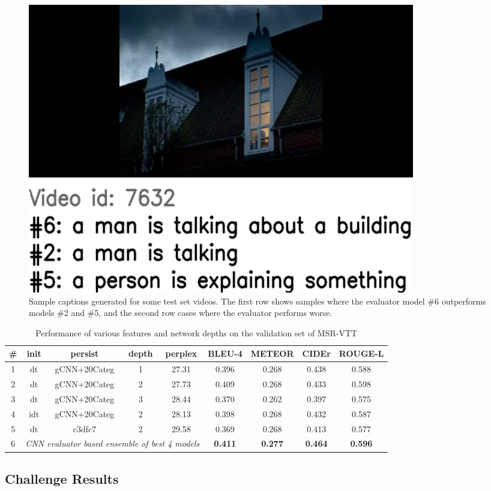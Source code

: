 \begin{figure}[thp]
\begin{center}
    \includegraphics[width=0.30\linewidth]{images/7632.jpg}
  \end{center}
  \vspace*{-5mm}
  \caption{Sample captions generated for some test set videos. The
    first row shows samples where the evaluator model \#6 outperforms
    models \#2 and \#5, and the second row cases where the evaluator
    performs worse.}
  \label{fig:capSamps}
\end{figure}

\begin{table}[thp]
  \caption{Performance of various features and 
    network depths on the validation set of MSR-VTT}
  \newcommand{\modpar}[4]{%
    \multirow{2}{*}{\emph{#1}} & \multirow{2}{*}{#2} & \multirow{2}{*}{#3}
    & \multirow{2}{*}{#4}}
  \centering
  \newcommand{\bs}{\small\bf}
  \begin{tabular}{||c|c|c|c|c|c|c|c|c|}
    \hline\hline
    \bf\# &\bf init &\bf persist &\bf depth &\bf perplex &\bs BLEU-4 &\bs METEOR &\bs CIDEr &\bs ROUGE-L \\\hline\hline
    1 & dt  & gCNN+20Categ & 1  & 27.31 & 0.396 & 0.268 & 0.438 & 0.588 \\
    2 & dt  & gCNN+20Categ & 2  & 27.73 & 0.409 & 0.268 & 0.433 & 0.598 \\
    3 & dt  & gCNN+20Categ & 3  & 28.44 & 0.370 & 0.262 & 0.397 & 0.575 \\\hline
    4 & idt & gCNN+20Categ & 2  & 28.13 & 0.398 & 0.268 & 0.432 & 0.587 \\
    5 & dt  & c3dfc7       & 2  & 29.58 & 0.369 & 0.268 & 0.413 & 0.577 \\\hline
    6 & \multicolumn{4}{c|}{\em CNN evaluator based ensemble of best 4 models}
                                  & \bf0.411 & \bf0.277 & \bf0.464 & \bf0.596 \\\hline
    \hline
  \end{tabular}
  \label{tab:resultsVal}
\end{table}


\subsection{Challenge Results}


